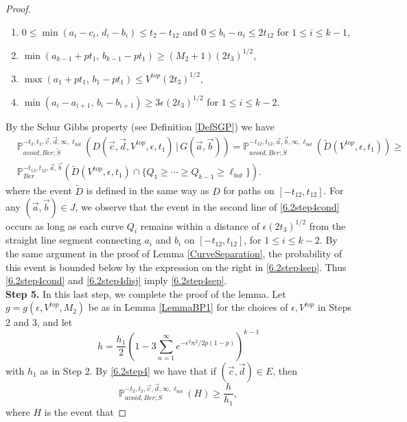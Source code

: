 \begin{proof}
\begin{enumerate}[label = (\arabic*)]
		\item $ 0 \leq \min(a_i - c_i,\, d_i - b_i) \leq t_2 - t_{12}$ and $0\leq b_i-a_i \leq 2t_{12}$ for $1\leq i\leq k-1$,
		
		\item $\min(a_{k-1} + pt_1,\, b_{k-1} - pt_1) \geq (M_2+1)(2t_3)^{1/2}$,
		
		\item $\max(a_1 + pt_1,\, b_1 - pt_1) \leq V^{top}(2t_3)^{1/2}$,
		
		\item $\min(a_i-a_{i+1}, \, b_i-b_{i+1}) \geq 3\epsilon(2t_3)^{1/2}$ for $1\leq i\leq k-2$.
		
	\end{enumerate}
	By the Schur Gibbs property (see Definition \ref{DefSGP}) we have
	\begin{equation}\label{6.2step4cond}
	\begin{split}
	&\mathbb{P}^{-t_2,t_2,\vec{c},\vec{d},\infty,\ell_{bot}}_{avoid,Ber;\tilde S}\left(D(\vec{c},\vec{d},V^{top},\epsilon,t_1) \,\big|\,G(\vec{a},\vec{b})\right) = \mathbb{P}^{-t_{12},t_{12},\vec{a},\vec{b},\infty,\ell_{bot}}_{avoid,Ber;\tilde S}\left(\tilde D(V^{top},\epsilon,t_1)\right) \geq \\
	&\mathbb{P}^{-t_{12},t_{12},\vec{a},\vec{b}}_{Ber}\left(\tilde D(V^{top},\epsilon,t_1)\cap \{Q_1\geq\cdots\geq Q_{k-1}\geq\ell_{bot}\}\right).
	\end{split}
	\end{equation}
	where the event $\tilde{D}$ is defined in the same way as $D$ for paths on $[-t_{12},t_{12}]$. For any $(\vec{a},\vec{b})\in J$, we observe that the event in the second line of \eqref{6.2step4cond} occurs as long as each curve $Q_i$ remains within a distance of $\epsilon(2t_3)^{1/2}$ from the straight line segment connecting $a_i$ and $b_i$ on $[-t_{12},t_{12}]$, for $1\leq i\leq k-2$. By the same argument in the proof of Lemma \ref{CurveSeparation}, the probability of this event is bounded below by the expression on the right in \eqref{6.2step4sep}. Thus \eqref{6.2step4cond} and \eqref{6.2step4disj} imply \eqref{6.2step4sep}.\\
	
	{\bf \raggedleft Step 5.} In this last step, we complete the proof of the lemma. Let $g=g(\epsilon,V^{top},M_2)$ be as in Lemma \ref{LemmaBP1} for the choices of $\epsilon,V^{top}$ in Steps 2 and 3, and let
	\[
	h = \frac{h_1}{2}\left(1-3\sum_{n=1}^\infty e^{-\epsilon^2 n^2/2p(1-p)}\right)^{k-1}
	\]
	with $h_1$ as in Step 2. By \eqref{6.2step4} we have that if $(\vec{c},\vec{d})\in E$, then
	$$\mathbb{P}_{avoid, Ber;S}^{-t_2, t_2, \vec{c}, \vec{d}, \infty, \ell_{bot}} ( H) \geq \frac{h}{h_1},$$
	where $H$ is the event that
	

\end{proof}
